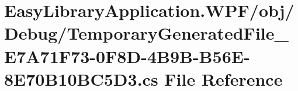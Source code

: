 \hypertarget{_easy_library_application_8_w_p_f_2obj_2_debug_2_temporary_generated_file___e7_a71_f73-0_f8_d-4_08cf2e21d8a88b8943f627b019c1ce15}{}\section{Easy\+Library\+Application.\+W\+PF/obj/\+Debug/\+Temporary\+Generated\+File\+\_\+\+E7\+A71\+F73-\/0\+F8\+D-\/4\+B9\+B-\/\+B56\+E-\/8\+E70\+B10\+B\+C5\+D3.cs File Reference}
\label{_easy_library_application_8_w_p_f_2obj_2_debug_2_temporary_generated_file___e7_a71_f73-0_f8_d-4_08cf2e21d8a88b8943f627b019c1ce15}
